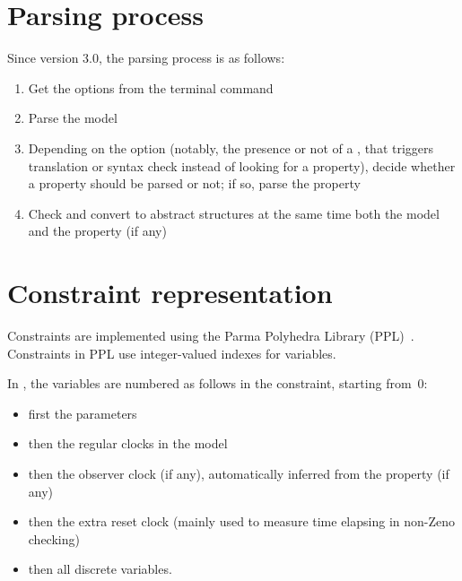 \chapter{Parsing process}


Since version 3.0, the parsing process is as follows:

\begin{enumerate}
	\item Get the options from the terminal command
	\item Parse the model
	\item Depending on the option (notably, the presence or not of a , that triggers translation or syntax check instead of looking for a property), decide whether a property should be parsed or not; if so, parse the property
	\item Check and convert to abstract structures at the same time both the model and the property (if any)
\end{enumerate}



\chapter{Constraint representation}

Constraints are implemented using the Parma Polyhedra Library (PPL)~\cite{BHZ08}.
Constraints in PPL use integer-valued indexes for variables.

In \imitator{}, the variables are numbered as follows in the constraint, starting from~0:
\begin{itemize}
	\item first the parameters
	\item then the regular clocks in the model
	\item then the observer clock (if any), automatically inferred from the property (if any)
	\item then the extra reset clock (mainly used to measure time elapsing in non-Zeno checking)
	\item then all discrete variables.
\end{itemize}

